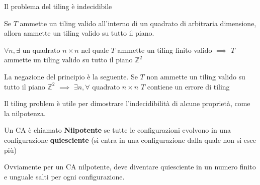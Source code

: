 \begin{teorema}
    Il problema del tiling è indecidibile
\end{teorema}


\begin{definizione} 
    Se $T$ ammette un tiling valido all'interno di un quadrato di arbitraria
    dimensione, allora ammette un tiling valido su tutto il piano.

    $\forall n, \exists$ un quadrato $n\times n$ nel quale $T$ ammette un tiling 
    finito valido $\implies$ $T$ ammette un tiling valido su tutto il piano $\mathbb{Z}^2$

\end{definizione}
\begin{nota} 
    La negazione del principio è la seguente. Se $T$ non ammette un tiling valido 
    su tutto il piano $\mathbb{Z}^2$ $\implies$ $\exists n, \forall$ quadrato $n\times n$ $T$
    contiene un errore di tiling
\end{nota}

Il tiling problem è utile per dimostrare l'indecidibilità di alcune proprietà, come 
la nilpotenza.

\begin{definizione} 
    Un CA è chiamato \textbf{Nilpotente} se tutte le configurazioni evolvono
    in una configurazione \textbf{quiesciente} (si entra in una configurazione 
    dalla quale non si esce più)
\end{definizione}

Ovviamente per un CA nilpotente, deve diventare quiesciente in un numero finito
e unguale salti per ogni configurazione. 

